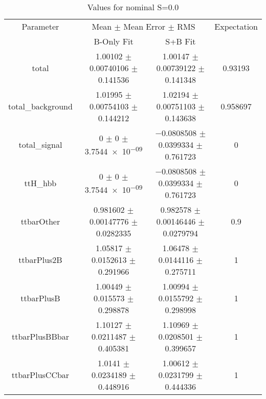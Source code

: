 \begin{table}
\centering
\caption{Values for nominal S=0.0}
\begin{tabular}{cccc}
\toprule
Parameter & \multicolumn{2}{c}{Mean $\pm$ Mean Error $\pm$ RMS} & Expectation\\
 & B-Only Fit & S+B Fit & \\
\midrule
total & \num{1.00102} $\pm$ \num{0.00740106} $\pm$ \num{0.141536} & \num{1.00147} $\pm$ \num{0.00739122} $\pm$ \num{0.141348} & \num{0.93193}\\
total\_background & \num{1.01995} $\pm$ \num{0.00754103} $\pm$ \num{0.144212} & \num{1.02194} $\pm$ \num{0.00751103} $\pm$ \num{0.143638} & \num{0.958697}\\
total\_signal & \num{0} $\pm$ \num{0} $\pm$ \num{3.7544e-09} & \num{-0.0808508} $\pm$ \num{0.0399334} $\pm$ \num{0.761723} & \num{0}\\
ttH\_hbb & \num{0} $\pm$ \num{0} $\pm$ \num{3.7544e-09} & \num{-0.0808508} $\pm$ \num{0.0399334} $\pm$ \num{0.761723} & \num{0}\\
ttbarOther & \num{0.981602} $\pm$ \num{0.00147776} $\pm$ \num{0.0282335} & \num{0.982578} $\pm$ \num{0.00146446} $\pm$ \num{0.0279794} & \num{0.9}\\
ttbarPlus2B & \num{1.05817} $\pm$ \num{0.0152613} $\pm$ \num{0.291966} & \num{1.06478} $\pm$ \num{0.0144116} $\pm$ \num{0.275711} & \num{1}\\
ttbarPlusB & \num{1.00449} $\pm$ \num{0.015573} $\pm$ \num{0.298878} & \num{1.00994} $\pm$ \num{0.0155792} $\pm$ \num{0.298998} & \num{1}\\
ttbarPlusBBbar & \num{1.10127} $\pm$ \num{0.0211487} $\pm$ \num{0.405381} & \num{1.10969} $\pm$ \num{0.0208501} $\pm$ \num{0.399657} & \num{1}\\
ttbarPlusCCbar & \num{1.0141} $\pm$ \num{0.0234189} $\pm$ \num{0.448916} & \num{1.00612} $\pm$ \num{0.0231799} $\pm$ \num{0.444336} & \num{1}\\
\bottomrule
\end{tabular}
\end{table}
